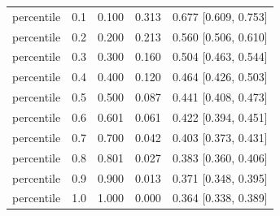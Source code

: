 \begin{table}[t]
{\begin{tabular}{lrrrr}
percentile & 0.1 & 0.100 & 0.313 & 0.677 [0.609, 0.753] \\
percentile & 0.2 & 0.200 & 0.213 & 0.560 [0.506, 0.610] \\
percentile & 0.3 & 0.300 & 0.160 & 0.504 [0.463, 0.544] \\
percentile & 0.4 & 0.400 & 0.120 & 0.464 [0.426, 0.503] \\
percentile & 0.5 & 0.500 & 0.087 & 0.441 [0.408, 0.473] \\
percentile & 0.6 & 0.601 & 0.061 & 0.422 [0.394, 0.451] \\
percentile & 0.7 & 0.700 & 0.042 & 0.403 [0.373, 0.431] \\
percentile & 0.8 & 0.801 & 0.027 & 0.383 [0.360, 0.406] \\
percentile & 0.9 & 0.900 & 0.013 & 0.371 [0.348, 0.395] \\
percentile & 1.0 & 1.000 & 0.000 & 0.364 [0.338, 0.389] \\
\bottomrule
\end{tabular}
}
\end{table}

